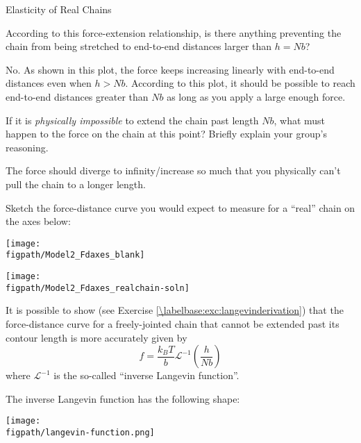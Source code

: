 \begin{activity}[extension]{Elasticity of Real Chains}
\begin{ctqs}
	\question According to this force-extension relationship, is there anything preventing the chain from being stretched to end-to-end distances larger than $h=Nb$?
	
		\begin{solution}[1.5in]{}
			No.  As shown in this plot, the force keeps increasing linearly with end-to-end distances even when $h > Nb$.  According to this plot, it should be possible to reach end-to-end distances greater than $Nb$ as long as you apply a large enough force.
		\end{solution}
	
	\question If it is \textit{physically impossible} to extend the chain past length $Nb$, what must happen to the force on the chain at this point?  Briefly explain your group's reasoning.
	
		\begin{solution}[1.5in]{}
			The force should diverge to infinity/increase so much that you physically can't pull the chain to a longer length.
		\end{solution}
	
	\question Sketch the force-distance curve you would expect to measure for a ``real'' chain on the axes below: \label{\labelbase:ctq:guessrealFd}
	
		\begin{solution}[2in]{\centerline{\texttt{[image: \\figpath/Model2\_Fdaxes\_blank]}}}
			\centerline{\texttt{[image: \\figpath/Model2\_Fdaxes\_realchain-soln]}}
		\end{solution}
	
\end{ctqs}

\begin{model}
\label{\labelbase:mdl:langevinchain}

	It is possible to show (see Exercise \ref{\labelbase:exc:langevinderivation}) 
	that the force-distance curve for a freely-jointed chain that cannot be extended past its contour length is more accurately given by
	\begin{equation*}
		f = \frac{k_BT}{b} \mathcal{L}^{-1}\left(\frac{h}{Nb}\right) \label{\labelbase:eqn:Fdlangevin}
	\end{equation*}
	where $\mathcal{L}^{-1}$ is the so-called ``inverse Langevin function''.
	
	The inverse Langevin function has the following shape:
	
	\centerline{\texttt{[image: \\figpath/langevin-function.png]}}
	

\end{model}
\end{activity}
